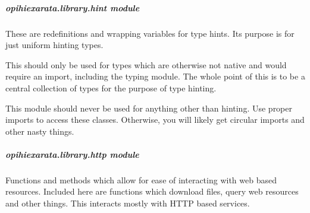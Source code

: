 \documentclass[letterpaper,11pt,english]{sphinxmanual}
\begin{document}
\sphinxstepscope


\subparagraph{opihiexarata.library.hint module}
\label{\detokenize{code/opihiexarata.library.hint:module-opihiexarata.library.hint}}\label{\detokenize{code/opihiexarata.library.hint:opihiexarata-library-hint-module}}\label{\detokenize{code/opihiexarata.library.hint::doc}}
\sphinxAtStartPar
These are redefinitions and wrapping variables for type hints. Its purpose
is for just uniform hinting types.

\sphinxAtStartPar
This should only be used for types which are otherwise not native and would
require an import, including the typing module. The whole point of this is to
be a central collection of types for the purpose of type hinting.

\sphinxAtStartPar
This module should never be used for anything other than hinting. Use proper
imports to access these classes. Otherwise, you will likely get circular
imports and other nasty things.

\sphinxstepscope


\subparagraph{opihiexarata.library.http module}
\label{\detokenize{code/opihiexarata.library.http:module-opihiexarata.library.http}}\label{\detokenize{code/opihiexarata.library.http:opihiexarata-library-http-module}}\label{\detokenize{code/opihiexarata.library.http::doc}}
\sphinxAtStartPar
Functions and methods which allow for ease of interacting with web based
resources. Included here are functions which download files, query web resources
and other things. This interacts mostly with HTTP based services.
\end{document}
